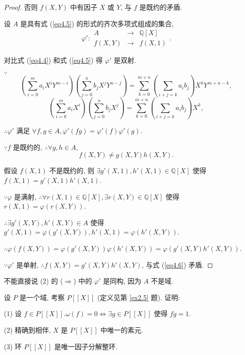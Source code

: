 \documentclass[color=black,device=normal,lang=cn,mode=geye]{elegantnote}
\begin{document}
\begin{proof}
    否则 $f(X,Y)$ 中有因子 $X$ 或 $Y$, 与 $f$ 是既约的矛盾.

    设 $A$ 是具有式 (\ref{eq4.5}) 的形式的齐次多项式组成的集合,
    \[\varphi':\begin{array}{rcl}
        A & \to & \mathbb{Q}[X] \\
        f(X,Y) & \to & f(X,1)
    \end{array}.\]

    对比式 (\ref{eq4.4}) 和式 (\ref{eq4.5}) 得 $\varphi'$ 是双射.

    $\because$
    \[\left(\sum\limits_{i=0}^ma_iX^iY^{m-i}\right)\left(\sum\limits_{j=0}^nb_jX^jY^{n-j}\right)=\sum\limits_{k=0}^{m+n}\left(\sum\limits_{i+j=k}a_ib_j\right)X^kY^{m+n-k},\]
    \[\left(\sum\limits_{i=0}^ma_iX^i\right)\left(\sum\limits_{j=0}^nb_jX^j\right)=\sum\limits_{k=0}^{m+n}\left(\sum\limits_{i+j=k}a_ib_j\right)X^k,\]

    $\therefore\varphi'$ 满足 $\forall f,g\in A,\varphi'(fg)=\varphi'(f)\varphi'(g)$.

    $\because f$ 是既约的, $\therefore\forall g,h\in A$,
    \begin{equation}\label{eq4.6}
        f(X,Y)\neq g(X,Y)h(X,Y).
    \end{equation}
    
    假设 $f(X,1)$ 不是既约的, 则 $\exists g'(X,1),h'(X,1)\in\mathbb{Q}[X]$ 使得 $f(X,1)=g'(X,1)h'(X,1)$.

    $\because\varphi$ 是满射, $\therefore\forall r(X,1)\in\mathbb{Q}[X],\exists r(X,Y)\in\mathbb{Q}[X]$ 使得 $r(X,1)=\varphi(r(X,Y))$.

    $\therefore\exists g'(X,Y),h'(X,Y)\in A$ 使得 $g'(X,1)=\varphi(g'(X,Y)),h'(X,1)=\varphi(h'(X,Y))$.

    $\therefore\varphi(f(X,Y))=\varphi(g'(X,Y))\varphi(h'(X,Y))=\varphi(g'(X,Y)h'(X,Y))$.

    $\because\varphi'$ 是单射, $\therefore f(X,Y)=g'(X,Y)h'(X,Y)$, 与式 (\ref{eq4.6}) 矛盾.
\end{proof}
\begin{note}
    不能直接说 (2) 的 ($\Rightarrow$) 中的 $\varphi'$ 是同构, 因为 $A$ 不是域.
\end{note}
\begin{exercise}\label{ex3.6}
    设 $P$ 是一个域, 考察 $P[[X]]$ (定义见第 \ref{ex2.5} 题). 证明:

    (1) 设 $f\in P[[X]].\omega(f)=0\Leftrightarrow\exists g\in P[[X]]$ 使得 $fg=1$.

    (2) 精确到相伴, $X$ 是 $P[[X]]$ 中唯一的素元.

    (3) 环 $P[[X]]$ 是唯一因子分解整环.
\end{exercise}
\end{document}
